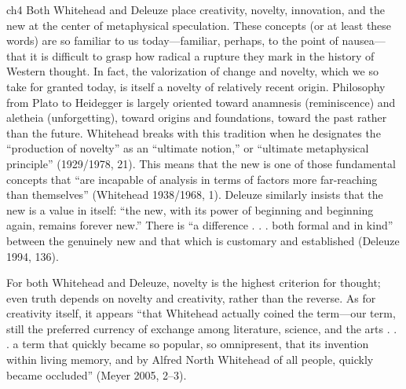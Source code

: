 ch4	
Both Whitehead and Deleuze place creativity, novelty, innovation, and the
new at the center of metaphysical speculation. These concepts (or at least these
words) are so familiar to us today—familiar, perhaps, to the point of nausea—
that it is difficult to grasp how radical a rupture they mark in the history of
Western thought. In fact, the valorization of change and novelty, which we so
take for granted today, is itself a novelty of relatively recent origin. Philosophy
from Plato to Heidegger is largely oriented toward anamnesis (reminiscence)
and aletheia (unforgetting), toward origins and foundations, toward the past
rather than the future. Whitehead breaks with this tradition when he designates
the “production of novelty” as an “ultimate notion,” or “ultimate metaphysical
principle” (1929/1978, 21). This means that the new is one of those
fundamental concepts that “are incapable of analysis in terms of factors more
far-reaching than themselves” (Whitehead 1938/1968, 1). Deleuze similarly
insists that the new is a value in itself: “the new, with its power of beginning
and beginning again, remains forever new.” There is “a difference . . . both formal
and in kind” between the genuinely new and that which is customary and
established (Deleuze 1994, 136).

For both Whitehead and Deleuze, novelty is the highest
criterion for thought; even truth depends on novelty and creativity, rather than
the reverse. As for creativity itself, it appears “that Whitehead actually coined
the term—our term, still the preferred currency of exchange among literature,
science, and the arts . . . a term that quickly became so popular, so omnipresent,
that its invention within living memory, and by Alfred North Whitehead of
all people, quickly became occluded” (Meyer 2005, 2–3).

